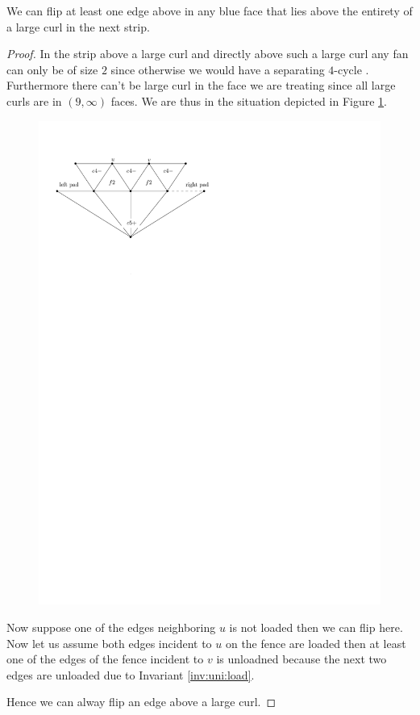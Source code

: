 \begin{lemma}
  \label{lm:uni:flipAboveLargeCurl}
  We can flip at least one edge above in any blue face that lies above the entirety of a large curl in the next strip.
\end{lemma}
\begin{proof}
  In the strip above a large curl and directly above such a large curl any fan can only be of size $2$ since otherwise we would have a separating $4$-cycle . Furthermore there can't be large curl in the face we are treating since all large curls are in $(9,\infty)$ faces.  We are thus in the situation depicted in Figure \ref{fig:uni:flipAboveLargeCurl}.

  \begin{figure}[h]
    \centering
    \includegraphics[scale=1]{unifiedAlgo/img/flipAboveLargeCurl}
    \caption{}
    \label{fig:uni:flipAboveLargeCurl}
  \end{figure}

  Now suppose one of the edges neighboring $u$ is not loaded then we can flip here. Now let us assume both edges incident to $u$ on the fence are loaded then at least one of the edges of the fence incident to $v$ is unloadned  because the next two edges are unloaded due to Invariant \ref{inv:uni:load}.

  Hence we can alway flip an edge above a large curl.
\end{proof}


